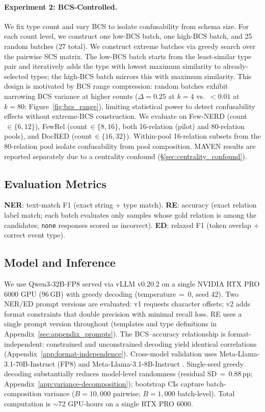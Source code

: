 \paragraph{Experiment 2: BCS-Controlled.}
We fix type count and vary BCS to isolate confusability from schema size. For each count level, we construct one low-BCS batch, one high-BCS batch, and 25 random batches (27 total). We construct extreme batches via greedy search over the pairwise SCS matrix. The low-BCS batch starts from the least-similar type pair and iteratively adds the type with lowest maximum similarity to already-selected types; the high-BCS batch mirrors this with maximum similarity. This design is motivated by BCS range compression: random batches exhibit narrowing BCS variance at higher counts ($\Delta = 0.25$ at $k{=}4$ vs.\ $< 0.01$ at $k{=}80$; Figure~\ref{fig:bcs_range}), limiting statistical power to detect confusability effects without extreme-BCS construction. We evaluate on Few-NERD (count$\,\in\{6, 12\}$), FewRel (count$\,\in\{8, 16\}$, both 16-relation (pilot) and 80-relation pools), and DocRED (count$\,\in\{16, 32\}$). Within-pool 16-relation subsets from the 80-relation pool isolate confusability from pool composition. MAVEN results are reported separately due to a centrality confound (\S\ref{sec:centrality_confound}).

\subsection{Evaluation Metrics}
\label{sec:metrics}

\textbf{NER}: text-match F1 (exact string + type match). \textbf{RE}: accuracy (exact relation label match; each batch evaluates only samples whose gold relation is among the candidates; \texttt{none} responses scored as incorrect). \textbf{ED}: relaxed F1 (token overlap + correct event type).


\subsection{Model and Inference}
\label{sec:model}

We use Qwen3-32B-FP8 \citep{qwen3-2025} served via vLLM v0.20.2 \citep{vllm-2023} on a single NVIDIA RTX PRO 6000 GPU (96\,GB) with greedy decoding (temperature${}\,=\,0$, seed 42). Two NER/ED prompt versions are evaluated: v1 requests character offsets; v2 adds format constraints that double precision with minimal recall loss. RE uses a single prompt version throughout (templates and type definitions in Appendix~\ref{sec:appendix_prompts}). The BCS--accuracy relationship is format-independent: constrained and unconstrained decoding yield identical correlations (Appendix~\ref{app:format-independence}). Cross-model validation uses Meta-Llama-3.1-70B-Instruct (FP8) and Meta-Llama-3.1-8B-Instruct \citep{llama3-2024}. Single-seed greedy decoding substantially reduces model-level randomness (residual SD${}\,=\,0.88$\,pp; Appendix~\ref{app:variance-decomposition}); bootstrap CIs capture batch-composition variance ($B{=}10{,}000$ pairwise; $B{=}1{,}000$ batch-level). Total computation is ${\sim}$72 GPU-hours on a single RTX PRO 6000.
